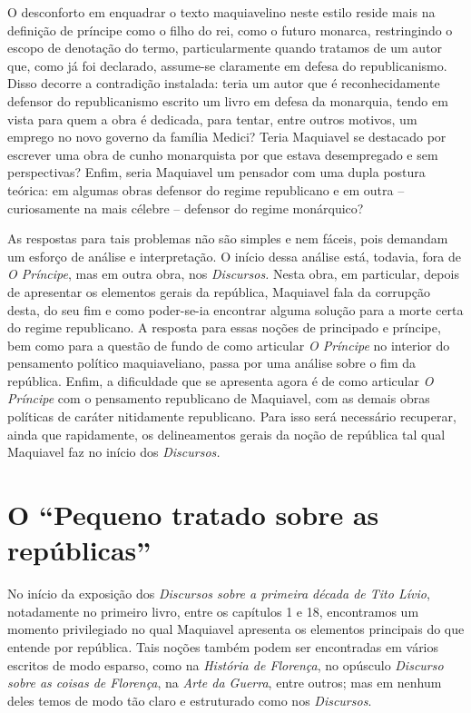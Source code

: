 O desconforto em enquadrar o texto maquiavelino neste estilo reside mais
na definição de príncipe como o filho do rei, como o futuro monarca,
restringindo o escopo de denotação do termo, particularmente quando
tratamos de um autor que, como já foi declarado, assume-se claramente em
defesa do republicanismo. Disso decorre a contradição instalada: teria
um autor que é reconhecidamente defensor do republicanismo escrito um
livro em defesa da monarquia, tendo em vista para quem a obra é
dedicada, para tentar, entre outros motivos, um emprego no novo governo
da família Medici? Teria Maquiavel se destacado por escrever uma obra de
cunho monarquista por que estava desempregado e sem perspectivas? Enfim,
seria Maquiavel um pensador com uma dupla postura teórica: em algumas
obras defensor do regime republicano e em outra -- curiosamente na mais
célebre -- defensor do regime monárquico?

As respostas para tais problemas não são simples e nem fáceis, pois
demandam um esforço de análise e interpretação. O início dessa análise
está, todavia, fora de \emph{O Príncipe}, mas em outra obra, nos
\emph{Discursos.} Nesta obra, em particular, depois de apresentar os
elementos gerais da república, Maquiavel fala da corrupção desta, do seu
fim e como poder-se-ia encontrar alguma solução para a morte certa do
regime republicano. A resposta para essas noções de principado e
príncipe, bem como para a questão de fundo de como articular \emph{O
Príncipe} no interior do pensamento político maquiaveliano, passa por
uma análise sobre o fim da república. Enfim, a dificuldade que se
apresenta agora é de como articular \emph{O Príncipe} com o pensamento
republicano de Maquiavel, com as demais obras políticas de caráter
nitidamente republicano. Para isso será necessário recuperar, ainda que
rapidamente, os delineamentos gerais da noção de república tal qual
Maquiavel faz no início dos \emph{Discursos.}

\section{O ``Pequeno tratado sobre as repúblicas''}

No início da exposição dos \emph{Discursos sobre a primeira década de
Tito Lívio}, notadamente no primeiro livro, entre os capítulos 1 e 18,
encontramos um momento privilegiado no qual Maquiavel apresenta os
elementos principais do que entende por república\emph{.} Tais noções
também podem ser encontradas em vários escritos de modo esparso, como na
\emph{História de Florença}, no opúsculo \emph{Discurso sobre as coisas
de Florença}, na \emph{Arte da Guerra}, entre outros; mas em nenhum
deles temos de modo tão claro e estruturado como nos \emph{Discursos}.

